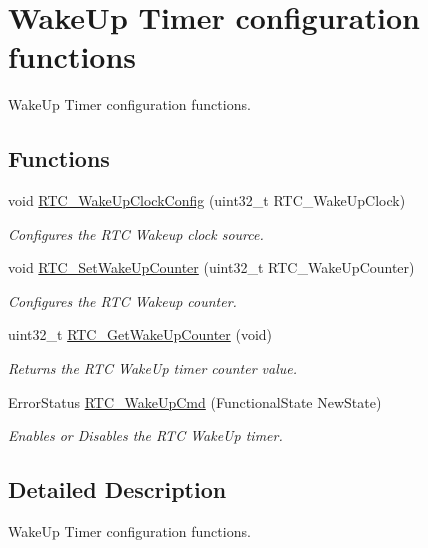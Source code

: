 \hypertarget{group___r_t_c___group4}{}\section{Wake\+Up Timer configuration functions}
\label{group___r_t_c___group4}


Wake\+Up Timer configuration functions.  


\subsection*{Functions}
\begin{DoxyCompactItemize}
\item 
void \hyperlink{group___r_t_c___group4_ga2557b02b318211112731a91a190c4b26}{R\+T\+C\+\_\+\+Wake\+Up\+Clock\+Config} (uint32\+\_\+t R\+T\+C\+\_\+\+Wake\+Up\+Clock)
\begin{DoxyCompactList}\small\item\em Configures the R\+T\+C Wakeup clock source. \end{DoxyCompactList}\item 
void \hyperlink{group___r_t_c___group4_ga1412044eb756a166c1cf341f3d46ed6b}{R\+T\+C\+\_\+\+Set\+Wake\+Up\+Counter} (uint32\+\_\+t R\+T\+C\+\_\+\+Wake\+Up\+Counter)
\begin{DoxyCompactList}\small\item\em Configures the R\+T\+C Wakeup counter. \end{DoxyCompactList}\item 
uint32\+\_\+t \hyperlink{group___r_t_c___group4_gae63aab672e917cc48e298162c3dec049}{R\+T\+C\+\_\+\+Get\+Wake\+Up\+Counter} (void)
\begin{DoxyCompactList}\small\item\em Returns the R\+T\+C Wake\+Up timer counter value. \end{DoxyCompactList}\item 
Error\+Status \hyperlink{group___r_t_c___group4_ga2ce05293303e0d7879c6d755c5355b4c}{R\+T\+C\+\_\+\+Wake\+Up\+Cmd} (Functional\+State New\+State)
\begin{DoxyCompactList}\small\item\em Enables or Disables the R\+T\+C Wake\+Up timer. \end{DoxyCompactList}\end{DoxyCompactItemize}


\subsection{Detailed Description}
Wake\+Up Timer configuration functions. 


